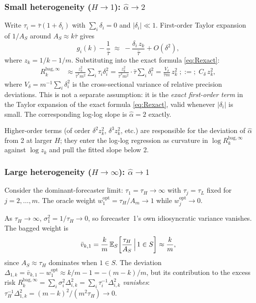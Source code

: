 \documentclass[12pt,a4paper]{article}
\theoremstyle{definition}
\newcommand{\Rk}{R_k^{\mathrm{bag},\infty}}
\newcommand{\E}{\mathbb{E}}
\begin{document}
\subsubsection*{Small heterogeneity ($H\to 1$): $\hat\alpha\to 2$}

Write $\tau_i=\bar\tau(1+\delta_i)$ with $\sum_i\delta_i=0$ and
$|\delta_i|\ll 1$.  First-order Taylor expansion of $1/A_S$ around
$A_S\approx k\bar\tau$ gives
\begin{equation}\label{eq:gi_taylor}
  g_i(k)-\frac{1}{\bar\tau}
  \;\approx\; -\frac{\delta_i\,z_k}{\bar\tau}
  +O(\delta^2),
\end{equation}
where $z_k=1/k-1/m$.  Substituting into the exact formula
\eqref{eq:Rexact}:
\begin{align*}
  \Rk &\approx \frac{z_k^2}{\bar\tau^2 m^2}\sum_i\tau_i\delta_i^2
       = \frac{z_k^2}{\bar\tau^2 m^2}\cdot\bar\tau\sum_i\delta_i^2
       = \frac{V_\delta}{\bar\tau m}\,z_k^2
       \;;:=;\; C_\delta\,z_k^2,
\end{align*}
where $V_\delta=m^{-1}\sum_i\delta_i^2$ is the cross-sectional variance of
relative precision deviations.  This is not a separate assumption: it is the
\emph{exact first-order term} in the Taylor expansion of the exact formula
\eqref{eq:Rexact}, valid whenever $|\delta_i|$ is small.  The corresponding
log-log slope is $\hat\alpha=2$ exactly.

Higher-order terms (of order $\delta^2 z_k^2$, $\delta^3 z_k^2$, etc.) are
responsible for the deviation of $\hat\alpha$ from 2 at larger $H$;
they enter the log-log regression as curvature in $\log\Rk$ against
$\log z_k$ and pull the fitted slope below 2.

\subsubsection*{Large heterogeneity ($H\to\infty$): $\hat\alpha\to 1$}

Consider the dominant-forecaster limit: $\tau_1=\tau_H\to\infty$ with
$\tau_j=\tau_L$ fixed for $j=2,\ldots,m$.  The oracle weight
$w_1^{\mathrm{opt}}=\tau_H/A_m\to 1$ while $w_j^{\mathrm{opt}}\to 0$.

As $\tau_H\to\infty$, $\sigma_1^2=1/\tau_H\to 0$, so forecaster~1's own
idiosyncratic variance vanishes.  The bagged weight is
\begin{equation}
  \bar v_{k,1} = \frac{k}{m}\,\E_S\!\left[\frac{\tau_H}{A_S}\,\Bigl|\,1\in S\right]
  \approx \frac{k}{m},
\end{equation}
since $A_S\approx\tau_H$ dominates when $1\in S$.  The deviation
$\Delta_{1,k}=\bar v_{k,1}-w_1^{\mathrm{opt}}\approx k/m-1=-(m-k)/m$, but its
contribution to the excess risk
$\Rk=\sum_i\sigma_i^2\Delta_{i,k}^2=\sum_i\tau_i^{-1}\Delta_{i,k}^2$
\emph{vanishes}: $\tau_H^{-1}\Delta_{1,k}^2=(m-k)^2/(m^2\tau_H)\to 0$.
\end{document}
